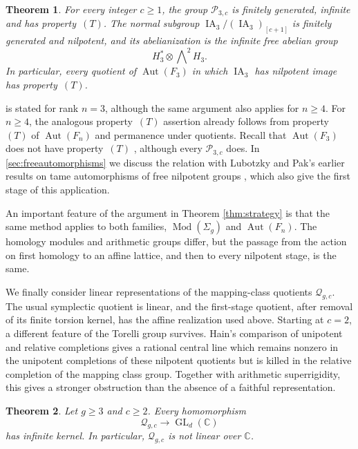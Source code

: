 \documentclass[11pt,a4paper]{article}
\newtheorem{maintheorem}{Theorem}
\theoremstyle{definition}
\newcommand{\C}{\mathbb C}
\newcommand{\Mod}{\operatorname{Mod}}
\newcommand{\GL}{\operatorname{GL}}
\newcommand{\Aut}{\operatorname{Aut}}
\newcommand{\rt}{(T)}
\begin{document}
\begin{maintheorem}\label{thm:autquotients}
For every integer \(c\ge1\), the group
\(\mathcal{P}_{3,c}\) is finitely generated, infinite and has
property~\(\rt\). The normal subgroup
\(\operatorname{IA}_3/(\operatorname{IA}_3)_{[c+1]}\) is
finitely generated and nilpotent, and its abelianization is the
infinite free abelian group
\[
 H_3^*\otimes\bigwedge\nolimits^2 H_3.
\]
In particular, every quotient of \(\Aut(F_3)\) in which
\(\operatorname{IA}_3\) has nilpotent image has property~\(\rt\).
\end{maintheorem}

 is stated for rank \(n=3\), although the same argument also applies for \(n\ge4\).
For \(n\ge4\), the
analogous property~\(\rt\) assertion already follows from
property~\(\rt\) of \(\Aut(F_n)\) and permanence under quotients.
Recall that \(\operatorname{Aut}(F_3)\) does not have
property~\(\rt\) \cite{McCool,GrunewaldLubotzky}, although every \(\mathcal{P}_{3,c}\) does.
In \cref{sec:freeautomorphisms} we discuss the relation with
Lubotzky and Pak's earlier results on tame automorphisms of free
nilpotent groups \cite{LubotzkyPak}, which also give the first
stage of this application.

An important feature of the argument in Theorem \ref{thm:strategy} is that the same method
applies to both families, \(\Mod(\Sigma_g)\) and \(\Aut(F_n)\). The homology modules and arithmetic
groups differ, but the passage from the action on first homology
to an affine lattice, and then to every nilpotent stage, is the
same. 

We finally consider linear representations of the mapping-class
quotients \(\mathcal{Q}_{g,c}\). The usual symplectic quotient is
linear, and the first-stage quotient, after removal of its finite
torsion kernel, has the affine realization used above. Starting
at \(c=2\), a different feature of the Torelli group survives.
Hain's comparison of unipotent and relative completions
\cite{Hain} gives a rational central line which remains nonzero
in the unipotent completions of these nilpotent quotients but is killed in the relative
completion of the mapping class group. Together with arithmetic
superrigidity, this gives a stronger obstruction than the
absence of a faithful representation.

\begin{maintheorem}\label{thm:nonlinearity}
Let \(g\ge3\) and \(c\ge2\). Every homomorphism
\[
 \mathcal{Q}_{g,c}\longrightarrow\GL_d(\C)
\]
has infinite kernel. In particular, \(\mathcal{Q}_{g,c}\) is not linear
over \(\C\).
\end{maintheorem}
\end{document}
